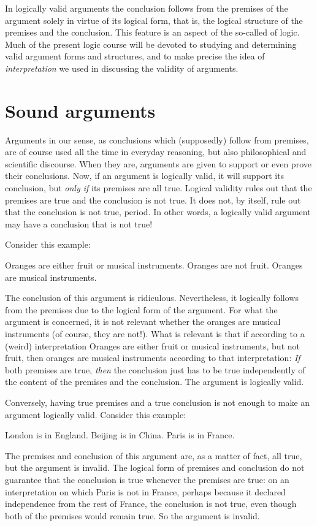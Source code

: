 In logically valid arguments the conclusion follows from the premises of the argument solely in virtue of its logical form, that is, the logical structure of the premises and the conclusion. This feature is an aspect of the so-called  of logic. Much of the present logic course will be devoted to studying and determining valid argument forms and structures, and to make precise the idea of \emph{interpretation} we used in discussing the validity of arguments.

\section{Sound arguments}

Arguments in our sense, as conclusions which (supposedly) follow from premises, are of course used all the time in everyday reasoning, but also philosophical and scientific discourse. When they are, arguments are given to support or even prove their conclusions. Now, if an argument is logically valid, it will support its conclusion, but \emph{only if} its premises are all true. Logical validity rules out that the premises are true and the conclusion is not true. It does not, by itself, rule out that the conclusion is not true, period.  In other words, a logically valid argument may have a conclusion that is not true!

Consider this example:
	\begin{earg}
		\prem Oranges are either fruit or musical instruments.
		\prem Oranges are not fruit.
		\conc Oranges are musical instruments.
	\end{earg}
The conclusion of this argument is ridiculous. Nevertheless, it logically follows from the premises due to the logical form of the argument. For what the argument is concerned, it is not relevant whether the oranges are musical instruments (of course, they are not!). What is relevant is that if according to a (weird) interpretation Oranges are either fruit or musical instruments, but not fruit, then oranges are musical instruments according to that interpretation: \emph{If} both premises are true, \emph{then} the conclusion just has to be true independently of the content of the premises and the conclusion. The argument is logically valid.

Conversely, having true premises and a true conclusion is not enough to make an argument logically valid. Consider this example:
	\begin{earg}
		\prem London is in England.
		\prem Beijing is in China.
		\conc Paris is in France.
	\end{earg}
The premises and conclusion of this argument are, as a matter of fact, all true, but the argument is invalid. The logical form of premises and conclusion do not guarantee that the conclusion is true whenever the premises are true: on an interpretation on which Paris is not in France, perhaps because it declared independence from the rest of France,  the conclusion is not true, even though both of the premises would remain true. So the argument is invalid. 

